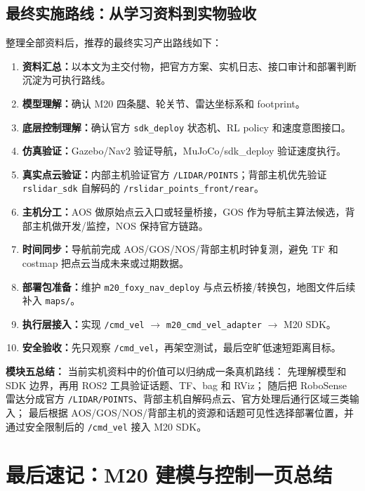 \documentclass[UTF8,11pt,a4paper]{ctexart}
\begin{document}
\subsection{最终实施路线：从学习资料到实物验收}

整理全部资料后，推荐的最终实习产出路线如下：

\begin{enumerate}
  \item \textbf{资料汇总：}以本文为主交付物，把官方方案、实机日志、接口审计和部署判断沉淀为可执行路线。
  \item \textbf{模型理解：}确认 M20 四条腿、轮关节、雷达坐标系和 footprint。
  \item \textbf{底层控制理解：}确认官方 \texttt{sdk\_deploy} 状态机、RL policy 和速度意图接口。
  \item \textbf{仿真验证：}Gazebo/Nav2 验证导航，MuJoCo/sdk\_deploy 验证速度执行。
  \item \textbf{真实点云验证：}内部主机验证官方 \texttt{/LIDAR/POINTS}；背部主机优先验证 \texttt{rslidar\_sdk} 自解码的 \texttt{/rslidar\_points\_front/rear}。
  \item \textbf{主机分工：}AOS 做原始点云入口或轻量桥接，GOS 作为导航主算法候选，背部主机做开发/监控，NOS 保持官方链路。
  \item \textbf{时间同步：}导航前完成 AOS/GOS/NOS/背部主机时钟复测，避免 TF 和 costmap 把点云当成未来或过期数据。
  \item \textbf{部署包准备：}维护 \texttt{m20\_foxy\_nav\_deploy} 与点云桥接/转换包，地图文件后续补入 \texttt{maps/}。
  \item \textbf{执行层接入：}实现 \texttt{/cmd\_vel} \(\rightarrow\) \texttt{m20\_cmd\_vel\_adapter} \(\rightarrow\) M20 SDK。
  \item \textbf{安全验收：}先只观察 \texttt{/cmd\_vel}，再架空测试，最后空旷低速短距离目标。
\end{enumerate}

\begin{answerbox}
\textbf{模块五总结：}
当前实机资料中的价值可以归纳成一条真机路线：
先理解模型和 SDK 边界，再用 ROS2 工具验证话题、TF、bag 和 RViz；
随后把 RoboSense 雷达分成官方 \texttt{/LIDAR/POINTS}、背部主机自解码点云、官方处理后通行区域三类输入；
最后根据 AOS/GOS/NOS/背部主机的资源和话题可见性选择部署位置，并通过安全限制后的 \texttt{/cmd\_vel} 接入 M20 SDK。
\end{answerbox}

\section{最后速记：M20 建模与控制一页总结}
\end{document}
